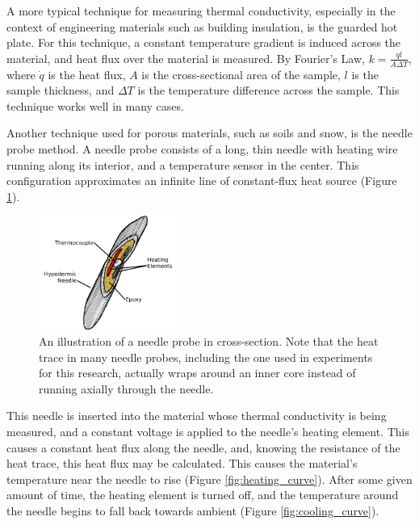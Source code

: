 A more typical technique for measuring thermal conductivity, especially in the
context of engineering materials such as building insulation, is the guarded
hot plate. For this technique, a constant temperature gradient is induced across
the material, and heat flux over the material is measured.  By Fourier's Law,
\(k = \frac{\dot{q}l}{A\Delta T}\), where \(\dot{q}\) is the heat flux, \(A\) is
the cross-sectional area of the sample, \(l\) is the sample thickness, and 
\(\Delta T\) is the temperature difference across the sample. This technique
works well in many cases.

Another technique used for porous materials, such as soils and snow, is the
needle probe method. A needle probe consists of a long, thin needle with heating
wire running along its interior, and a temperature sensor in the center. This
configuration approximates an infinite line of constant-flux heat source
(Figure \ref{fig:needle_xsect}). \cite{basictheory}

\begin{figure}[h]
\centering
\includegraphics[width=0.4\textwidth]{fig/needle_xsect.png}
\caption{An illustration of a needle probe in cross-section. Note that the heat
trace in many needle probes, including the one used in experiments for this
research, actually wraps around an inner core instead of running axially through
the needle.}
\label{fig:needle_xsect}
\end{figure}

This needle is inserted into the material whose thermal conductivity is being
measured, and a constant voltage is applied to the needle's heating element.
This causes a constant heat flux along the needle, and, knowing the resistance
of the heat trace, this heat flux may be calculated. This causes the material's
temperature near the needle to rise (Figure \ref{fig:heating_curve}). After some
given amount of time, the heating element is turned off, and the temperature
around the needle begins to fall back towards ambient (Figure \ref{fig:cooling_curve}).


